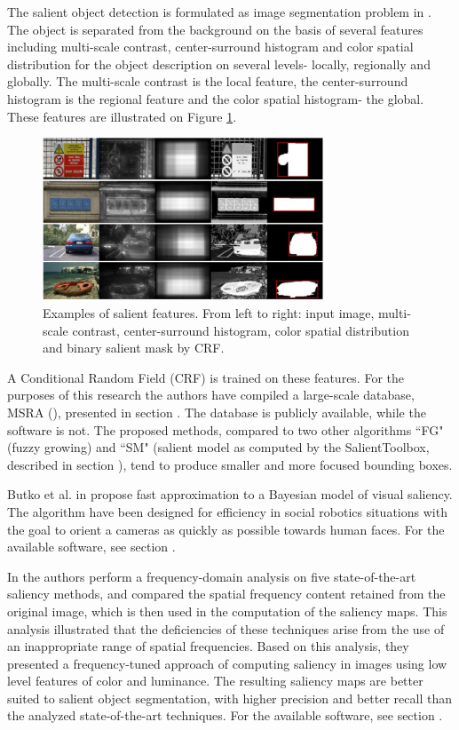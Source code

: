 The salient object detection is formulated as image segmentation problem in \cite{LiuCVPR2007}. The object is separated from the background on the basis of several features including multi-scale contrast, center-surround histogram and color spatial distribution for the object description on several levels- locally, regionally and globally. The multi-scale contrast is the local feature, the center-surround histogram is the regional feature and the color spatial histogram- the global. These features are illustrated on Figure \ref{fig:sal_feat_liu07}.
\begin{figure}[H]
\begin{center}
\includegraphics[width=0.75\textwidth]{fig/SalientFeatures_Liu2007}
\end{center}
\caption{Examples of salient features. From left to right: input image, multi-scale contrast, center-surround histogram, color spatial distribution and binary salient mask by CRF.}
\label{fig:sal_feat_liu07}
\end{figure}
A Conditional Random Field (CRF) is trained on these features. 
For the purposes of this research the authors have compiled a large-scale database, MSRA (\cite{msra_db}), presented in section . The database is publicly available, while the software is not. The proposed methods, compared to two other algorithms ``FG" (fuzzy growing) and ``SM" (salient model as computed by the SalientToolbox, described in section ), tend to produce smaller and more focused bounding boxes.

Butko et al. in \cite{ButkoZCM08} propose fast approximation to a Bayesian model of visual saliency. The algorithm have been designed for efficiency in social robotics situations with the goal to orient a cameras as quickly as possible towards human faces. For the available software, see section .

In \cite{LCAV-CONF-2009-012} the authors perform a frequency-domain analysis on five state-of-the-art saliency methods, and compared the spatial frequency
content retained from the original image, which is then used in the computation of the saliency maps. This analysis illustrated that the deficiencies of these techniques
arise from the use of an inappropriate range of spatial frequencies. Based on this analysis, they presented a frequency-tuned
approach of computing saliency in images using low level features of color and luminance. The resulting saliency maps are better suited to salient object segmentation, with higher precision and better recall than the analyzed state-of-the-art techniques. For the available software, see section .

